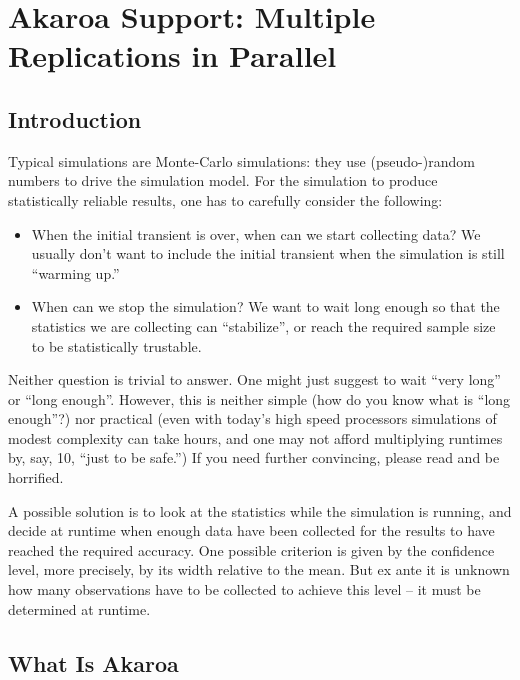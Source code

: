 \section{Akaroa Support: Multiple Replications in Parallel}
\label{sec:run-sim:akaroa}

\subsection{Introduction}
\label{sec:run-sim:akaroa-introduction}

Typical simulations are Monte-Carlo simulations: they use
(pseudo-)random numbers to drive the simulation model.
For the simulation to produce statistically reliable results,
one has to carefully consider the following:

\begin{itemize}
  \item{When the initial transient is over, when can we start
    collecting data? We usually don't want to include the
    initial transient when the simulation is still ``warming up.''}
  \item{When can we stop the simulation? We want to wait long enough
    so that the statistics we are collecting can ``stabilize'',
    or reach the required sample size to be statistically trustable.}
\end{itemize}

Neither question is trivial to answer. One might just suggest
to wait ``very long'' or ``long enough''. However, this is neither
simple (how do you know what is ``long enough''?) nor practical
(even with today's high speed processors simulations of modest complexity
can take hours, and one may not afford multiplying runtimes by,
say, 10, ``just to be safe.'') If you need further convincing,
please read \cite{Pawlikowsky02} and be horrified.

A possible solution is to look at the statistics while the simulation
is running, and decide at runtime when enough data have been
collected for the results to have reached the required accuracy.
One possible criterion is given by the confidence level,
more precisely, by its width relative to the mean.
But ex ante it is unknown how many observations have to be collected
to achieve this level -- it must be determined at runtime.


\subsection{What Is Akaroa}
\label{sec:run-sim:what-is-akaroa}

